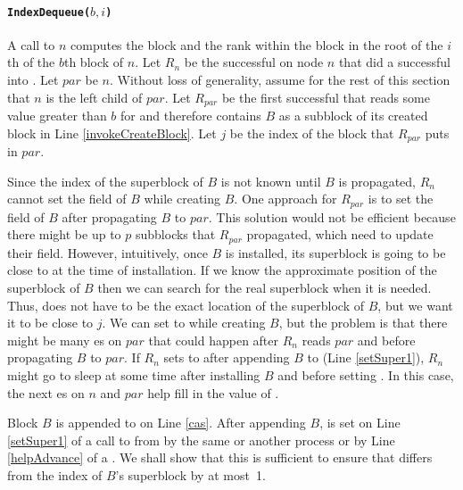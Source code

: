 \paragraph{\tt{IndexDequeue($b,i$)}}

A call to $n$ computes the block and the rank
within the block in the root of the $i$th  of the $b$th
block of $n$. Let $R_n$ be the successful   on node $n$
that did a successful  into . Let
$par$ be $n$. Without loss of generality, assume for the
rest of this section that ${n}$ is the left child of $par$. Let
$R_{par}$ be the first successful  that reads some
value greater than ${b}$ for  and therefore contains
${B}$ as a subblock of its created block in Line
\ref{invokeCreateBlock}. Let $j$ be the index of the block that
$R_{par}$ puts in $par$. 
 
Since the index of the superblock of ${B}$ is not known until $B$ is
propagated, $R_n$ cannot set the  field of ${B}$ while
creating $B$. One approach for $R_{par}$ is to set the 
field of ${B}$ after propagating $B$ to $par$. This solution would not
be efficient because there might be up to $p$ subblocks that $R_{par}$
propagated, which need to update their  field. However,
intuitively, once $B$ is installed, its superblock is going to be
close to  at the time of installation. If we know
the approximate position of the superblock of $B$ then we can search
for the real superblock when it is needed. Thus,  does
not have to be the exact location of  the superblock of $B$, but we
want it to be close to $j$. We can set  to
 while creating $B$, but the problem is that there
might be many es on $par$ that could happen after $R_n$
reads $par$ and before propagating $B$ to $par$. If $R_n$
sets  to  after appending $B$ to
 (Line \ref{setSuper1}), $R_n$ might go to sleep at
some time after installing $B$ and before setting . In
this case, the next es on $n$ and $par$ help fill in the
value of . 

Block $B$ is appended to  on Line \ref{cas}. After
appending $B$,  is set on Line \ref{setSuper1} of a call
to  from  by the same or another process
or by Line \ref{helpAdvance} of a . We shall
show that this is sufficient to ensure that  differs
from the index of $B$'s superblock by at most~1. 

